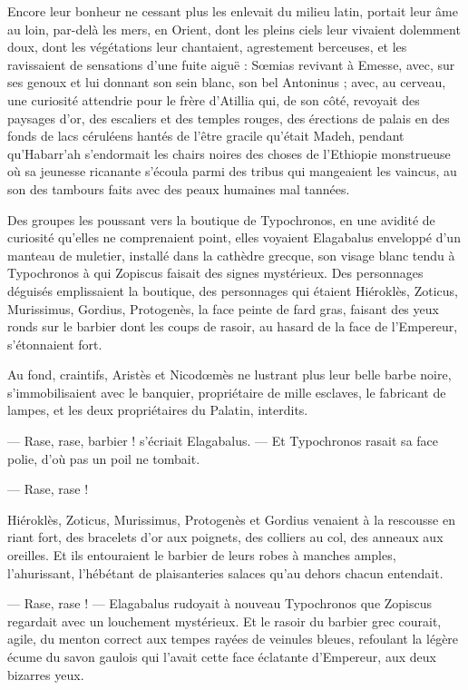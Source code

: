 \documentclass[a4paper, 11pt, oneside, polutonikogreek, french]{article}
\begin{document}
Encore leur bonheur ne cessant plus les enlevait du milieu latin, portait leur âme au loin, par-delà les mers, en Orient, dont les pleins ciels leur vivaient dolemment doux, dont les végétations leur chantaient, agrestement berceuses, et les ravissaient de sensations d'une fuite aiguë : Sœmias revivant à Emesse, avec, sur ses genoux et lui donnant son sein blanc, son bel Antoninus ; avec, au cerveau, une curiosité attendrie pour le frère d'Atillia qui, de son côté, revoyait des paysages d'or, des escaliers et des temples rouges, des érections de palais en des fonds de lacs céruléens hantés de l'être gracile qu'était Madeh, pendant qu'Habarr'ah s'endormait les chairs noires des choses de l'Ethiopie monstrueuse où sa jeunesse ricanante s'écoula parmi des tribus qui mangeaient les vaincus, au son des tambours faits avec des peaux humaines mal tannées.

Des groupes les poussant vers la boutique de Typochronos, en une avidité de curiosité qu'elles ne comprenaient point, elles voyaient Elagabalus enveloppé d'un manteau de muletier, installé dans la cathèdre grecque, son visage blanc tendu à Typochronos à qui Zopiscus faisait des signes mystérieux. Des personnages déguisés emplissaient la boutique, des personnages qui étaient Hiéroklès, Zoticus, Murissimus, Gordius, Protogenès, la face peinte de fard gras, faisant des yeux ronds sur le barbier dont les coups de rasoir, au hasard de la face de l'Empereur, s'étonnaient fort.

Au fond, craintifs, Aristès et Nicodœmès ne lustrant plus leur belle barbe noire, s'immobilisaient avec le banquier, propriétaire de mille esclaves, le fabricant de lampes, et les deux propriétaires du Palatin, interdits.

--- Rase, rase, barbier ! s'écriait Elagabalus. --- Et Typochronos rasait sa face polie, d'où pas un poil ne tombait.

--- Rase, rase !

Hiéroklès, Zoticus, Murissimus, Protogenès et Gordius venaient à la rescousse en riant fort, des bracelets d'or aux poignets, des colliers au col, des anneaux aux oreilles. Et ils entouraient le barbier de leurs robes à manches amples, l'ahurissant, l'hébétant de plaisanteries salaces qu'au dehors chacun entendait.

--- Rase, rase ! --- Elagabalus rudoyait à nouveau Typochronos que Zopiscus regardait avec un louchement mystérieux. Et le rasoir du barbier grec courait, agile, du menton correct aux tempes rayées de veinules bleues, refoulant la légère écume du savon gaulois qui l’avait cette face éclatante d'Empereur, aux deux bizarres yeux.
\end{document}
